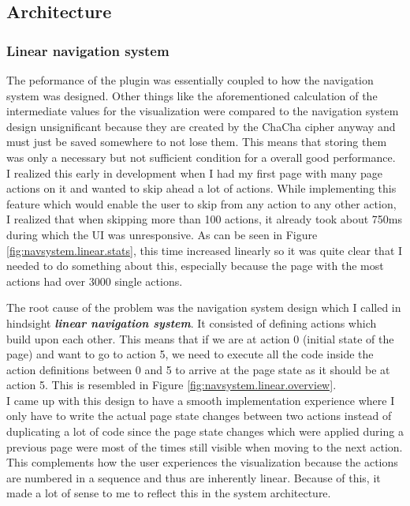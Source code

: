 \subsection{Architecture}

\subsubsection{Linear navigation system}

The peformance of the plugin was essentially coupled to how the navigation system was designed. Other things like the aforementioned calculation of the intermediate values for the visualization were compared to the navigation system design unsignificant because they are created by the ChaCha cipher anyway and must just be saved somewhere to not lose them. This means that storing them was only a necessary but not sufficient condition for a overall good performance. \\
I realized this early in development when I had my first page with many page actions on it and wanted to skip ahead a lot of actions. While implementing this feature which would enable the user to skip from any action to any other action, I realized that when skipping more than 100 actions, it already took about 750ms during which the UI was unresponsive. As can be seen in Figure \ref{fig:navsystem.linear.stats}, this time increased linearly so it was quite clear that I needed to do something about this, especially because the page with the most actions had over 3000 single actions.

The root cause of the problem was the navigation system design which I called in hindsight \textbf{\textit{linear navigation system}}. It consisted of defining actions which build upon each other. This means that if we are at action 0 (initial state of the page) and want to go to action 5, we need to execute all the code inside the action definitions between 0 and 5 to arrive at the page state as it should be at action 5. This is resembled in Figure \ref{fig:navsystem.linear.overview}. \\
I came up with this design to have a smooth implementation experience where I only have to write the actual page state changes between two actions instead of duplicating a lot of code since the page state changes which were applied during a previous page were most of the times still visible when moving to the next action. This complements how the user experiences the visualization because the actions are numbered in a sequence and thus are inherently linear. Because of this, it made a lot of sense to me to reflect this in the system architecture.

